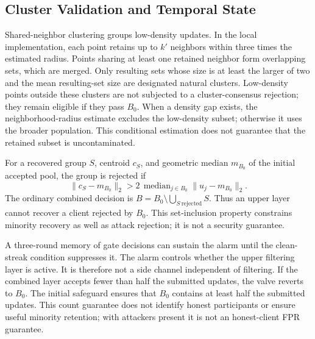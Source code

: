 \documentclass[journal]{IEEEtran}
\begin{document}
\subsection{Cluster Validation and Temporal State}
Shared-neighbor clustering groups low-density updates. In the local implementation, each point retains up to $k'$ neighbors within three times the estimated radius. Points sharing at least one retained neighbor form overlapping sets, which are merged. Only resulting sets whose size is at least the larger of two and the mean resulting-set size are designated natural clusters. Low-density points outside these clusters are not subjected to a cluster-consensus rejection; they remain eligible if they pass $B_0$. When a density gap exists, the neighborhood-radius estimate excludes the low-density subset; otherwise it uses the broader population. This conditional estimation does not guarantee that the retained subset is uncontaminated.

For a recovered group $S$, centroid $c_S$, and geometric median $m_{B_0}$ of the initial accepted pool, the group is rejected if
\begin{equation}
 \|c_S-m_{B_0}\|_2>2\,\operatorname{median}_{j\in B_0}\|u_j-m_{B_0}\|_2.
\end{equation}
The ordinary combined decision is $B=B_0\setminus\bigcup_{S\mathrm{\ rejected}}S$. Thus an upper layer cannot recover a client rejected by $B_0$. This set-inclusion property constrains minority recovery as well as attack rejection; it is not a security guarantee.

A three-round memory of gate decisions can sustain the alarm until the clean-streak condition suppresses it. The alarm controls whether the upper filtering layer is active. It is therefore not a side channel independent of filtering. If the combined layer accepts fewer than half the submitted updates, the valve reverts to $B_0$. The initial safeguard ensures that $B_0$ contains at least half the submitted updates. This count guarantee does not identify honest participants or ensure useful minority retention; with attackers present it is not an honest-client FPR guarantee.
\end{document}
